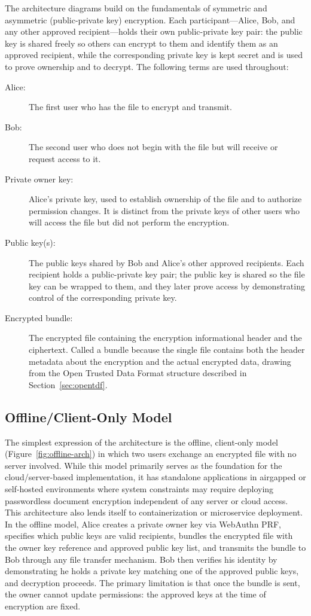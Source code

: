 The architecture diagrams build on the fundamentals of symmetric and asymmetric (public-private key) encryption. Each participant---Alice, Bob, and any other approved recipient---holds their own public-private key pair: the public key is shared freely so others can encrypt to them and identify them as an approved recipient, while the corresponding private key is kept secret and is used to prove ownership and to decrypt. The following terms are used throughout:

\begin{description}
    \item[Alice:] The first user who has the file to encrypt and transmit.
    \item[Bob:] The second user who does not begin with the file but will receive or request access to it.
    \item[Private owner key:] Alice's private key, used to establish ownership of the file and to authorize permission changes. It is distinct from the private keys of other users who will access the file but did not perform the encryption.
    \item[Public key(s):] The public keys shared by Bob and Alice's other approved recipients. Each recipient holds a public-private key pair; the public key is shared so the file key can be wrapped to them, and they later prove access by demonstrating control of the corresponding private key.
    \item[Encrypted bundle:] The encrypted file containing the encryption informational header and the ciphertext. Called a bundle because the single file contains both the header metadata about the encryption and the actual encrypted data, drawing from the Open Trusted Data Format structure described in Section~\ref{sec:opentdf}.
\end{description}

\subsection{Offline/Client-Only Model}
\label{sec:offline-model}

The simplest expression of the architecture is the offline, client-only model (Figure~\ref{fig:offline-arch}) in which two users exchange an encrypted file with no server involved. While this model primarily serves as the foundation for the cloud/server-based implementation, it has standalone applications in airgapped or self-hosted environments where system constraints may require deploying passwordless document encryption independent of any server or cloud access. This architecture also lends itself to containerization or microservice deployment. In the offline model, Alice creates a private owner key via WebAuthn PRF, specifies which public keys are valid recipients, bundles the encrypted file with the owner key reference and approved public key list, and transmits the bundle to Bob through any file transfer mechanism. Bob then verifies his identity by demonstrating he holds a private key matching one of the approved public keys, and decryption proceeds. The primary limitation is that once the bundle is sent, the owner cannot update permissions: the approved keys at the time of encryption are fixed.

